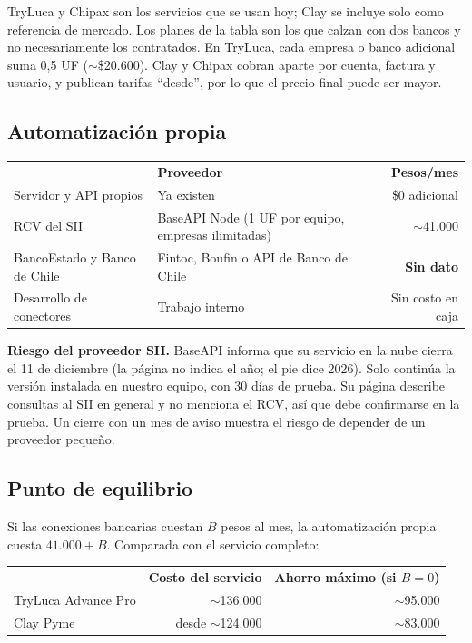 \documentclass[11pt,a4paper]{article}
\newcommand{\tablahead}[1]{{\color{white}\sffamily\bfseries #1}}
\begin{document}
TryLuca y Chipax son los servicios que se usan hoy; Clay se incluye solo como referencia de mercado. Los planes de la tabla son los que calzan con dos bancos y no necesariamente los contratados. En TryLuca, cada empresa o banco adicional suma 0,5 UF ($\sim$\$20.600). Clay y Chipax cobran aparte por cuenta, factura y usuario, y publican tarifas ``desde'', por lo que el precio final puede ser mayor.

\subsection{Automatización propia}

\begin{center}
\small
\begin{tabularx}{\textwidth}{@{}L L r@{}}
\rowcolor{azul}\tablahead{Pieza} & \tablahead{Proveedor} & \tablahead{Pesos/mes} \\
Servidor y API propios & Ya existen & \$0 adicional \\
RCV del SII & BaseAPI Node (1 UF por equipo, empresas ilimitadas) & $\sim$41.000 \\
BancoEstado y Banco de Chile & Fintoc, Boufin o API de Banco de Chile & \textbf{Sin dato} \\
Desarrollo de conectores & Trabajo interno & Sin costo en caja \\
\end{tabularx}
\end{center}

\begin{aviso}
\textbf{Riesgo del proveedor SII.} BaseAPI informa que su servicio en la nube cierra el 11 de diciembre (la página no indica el año; el pie dice 2026). Solo continúa la versión instalada en nuestro equipo, con 30 días de prueba. Su página describe consultas al SII en general y no menciona el RCV, así que debe confirmarse en la prueba. Un cierre con un mes de aviso muestra el riesgo de depender de un proveedor pequeño.
\end{aviso}

\subsection{Punto de equilibrio}

Si las conexiones bancarias cuestan $B$ pesos al mes, la automatización propia cuesta $41.000 + B$. Comparada con el servicio completo:

\begin{center}
\small
\begin{tabularx}{\textwidth}{@{}L r r@{}}
\rowcolor{azul}\tablahead{Se compara con} & \tablahead{Costo del servicio} & \tablahead{Ahorro máximo (si $B=0$)} \\
TryLuca Advance Pro & $\sim$136.000 & $\sim$95.000 \\
Clay Pyme & desde $\sim$124.000 & $\sim$83.000 \\
\end{tabularx}
\end{center}
\end{document}
